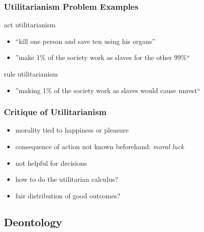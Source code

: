\documentclass[dvipsnames]{beamer}
\theoremstyle{plain}
\begin{document}
\begin{frame}
  \frametitle{Utilitarianism Problem Examples}

  \begin{exampleblock}{act utilitarianism}
    \begin{itemize}
      \item ``kill one person and save ten using his organs''
      \item ''make 1\% of the society work as slaves for the other 99\%``
    \end{itemize}
  \end{exampleblock}

  \pause
  \begin{exampleblock}{rule utilitarianism}
    \begin{itemize}
      \item ''making 1\% of the society work as slaves would cause unrest``
    \end{itemize}
  \end{exampleblock}
\end{frame}

\begin{frame}
  \frametitle{Critique of Utilitarianism}

  \begin{itemize}
    \item morality tied to happiness or pleasure

    \pause
    \medskip
    \item consequence of action not known beforehand: \emph{moral luck}

    \pause
    \medskip
    \item not helpful for decisions
    \item how to do the utilitarian calculus?

    \pause
    \medskip
    \item fair distribution of good outcomes?
  \end{itemize}
\end{frame}

\subsection{Deontology}
\end{document}
